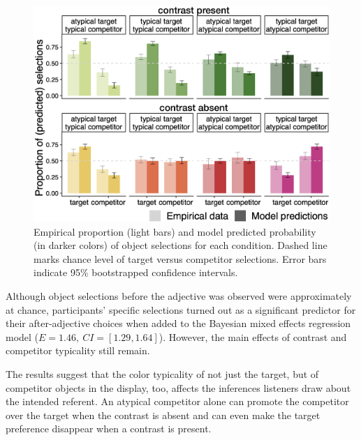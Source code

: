 \documentclass[10pt,letterpaper]{article}
\begin{document}
\begin{figure}
	\begin{center}
		\includegraphics[width=.475\textwidth]{graphs/model-bycond-paper.pdf}
	\end{center}
\caption{Empirical proportion (light bars) and model predicted probability (in darker colors) of object selections for each condition. Dashed line marks chance level of target versus competitor selections. Error bars indicate 95\% bootstrapped confidence intervals.} %
\label{modelcompr-results}
\end{figure}

Although object selections before the adjective was observed were approximately at chance, participants' specific selections turned out as a significant predictor for their after-adjective choices when added to the Bayesian mixed effects regression model ($E=1.46,\ CI=[1.29,1.64]$). However, the main effects of contrast and competitor typicality still remain.


The results suggest that the color typicality of not just the target, but of competitor objects in the display, too, affects the inferences listeners draw about the intended referent. An atypical competitor alone can promote the competitor over the target when the contrast is absent and can even make the target preference disappear when a contrast is present. %
\end{document}
